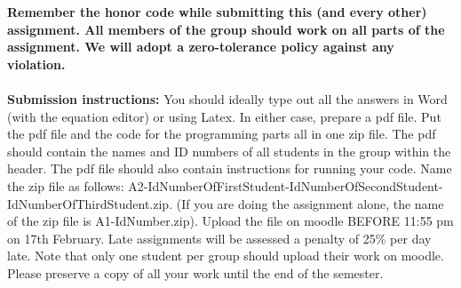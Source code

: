 \documentclass[11pt]{article}
\begin{document}
\maketitle

\textbf{Remember the honor code while submitting this (and every other) assignment. All members of the group should work on all parts of the assignment. We will adopt a \textbf{zero-tolerance policy} against any violation.}
\\
\\
\textbf{Submission instructions:} You should ideally type out all the answers in Word (with the equation editor) or using Latex. In either case, prepare a pdf file. Put the pdf file and the code for the programming parts all in one zip file. The pdf should contain the names and ID numbers of all students in the group within the header. The pdf file should also contain instructions for running your code. Name the zip file as follows: A2-IdNumberOfFirstStudent-IdNumberOfSecondStudent-IdNumberOfThirdStudent.zip. (If you are doing the assignment alone, the name of the zip file is A1-IdNumber.zip). Upload the file on moodle BEFORE 11:55 pm on 17th February. Late assignments will be assessed a penalty of 25\% per day late. Note that only one student per group should upload their work on moodle. Please preserve a copy of all your work until the end of the semester. 
\end{document}
